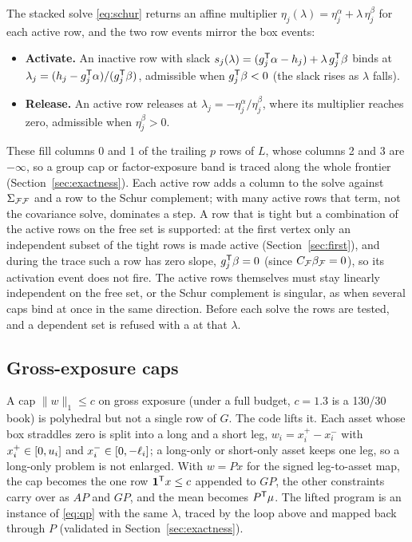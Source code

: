 The stacked solve \eqref{eq:schur} returns an affine multiplier
$\eta_j(\lambda) = \eta_j^{\alpha} + \lambda\,\eta_j^{\beta}$ for each active row, and
the two row events mirror the box events:
\begin{itemize}
\item \textbf{Activate.} An inactive row with slack
$s_j(\lambda) = (g_j^{\mathsf{T}}\alpha - h_j) + \lambda\,g_j^{\mathsf{T}}\beta$ binds at
$\lambda_j = (h_j - g_j^{\mathsf{T}}\alpha)/(g_j^{\mathsf{T}}\beta)$, admissible when
$g_j^{\mathsf{T}}\beta < 0$ (the slack rises as $\lambda$ falls).
\item \textbf{Release.} An active row releases at
$\lambda_j = -\eta_j^{\alpha}/\eta_j^{\beta}$, where its multiplier reaches zero,
admissible when $\eta_j^{\beta} > 0$.
\end{itemize}
These fill columns 0 and 1 of the trailing $p$ rows of $L$, whose columns 2 and 3 are
$-\infty$, so a group cap or factor-exposure band is
traced along the whole frontier (Section~\ref{sec:exactness}). Each active row adds a column
to the solve against $\Sigma_{\mathcal{F}\mathcal{F}}$ and a row to the Schur complement; with many active
rows that term, not the covariance solve, dominates a step. A row that is tight but a combination of the active rows on the
free set is supported: at the first vertex only an independent subset of the tight rows
is made active (Section~\ref{sec:first}), and during the trace such a row has zero slope,
$g_j^{\mathsf{T}}\beta = 0$ (since $C_{\mathcal{F}}\beta_{\mathcal{F}} = 0$), so its activation event does not fire.
The active rows themselves must stay linearly independent on the free set, or the Schur
complement is singular, as when several caps bind at once in the same direction. Before
each solve the rows are tested, and a dependent set is refused with a
 at that $\lambda$.

\subsection{Gross-exposure caps}
\label{sec:leverage}

A cap $\lVert w\rVert_1 \le c$ on gross exposure (under a full budget, $c = 1.3$ is a
130/30 book) is polyhedral but not a single row of $G$. The code lifts it. Each asset
whose box straddles zero is split into a long and a short leg, $w_i = x_i^+ - x_i^-$
with $x_i^+\in[0,u_i]$ and $x_i^-\in[0,-\ell_i]$; a long-only or short-only asset keeps one
leg, so a long-only problem is not enlarged. With $w = Px$ for the signed
leg-to-asset map, the cap becomes the one row $\mathbf{1}^{\mathsf{T}} x \le c$ appended to
$GP$, the other constraints carry over as $AP$ and $GP$, and the mean becomes
$P^{\mathsf{T}}\mu$. The lifted program is an instance of \eqref{eq:qp} with the same
$\lambda$, traced by the loop above and mapped back through $P$ (validated in
Section~\ref{sec:exactness}).

